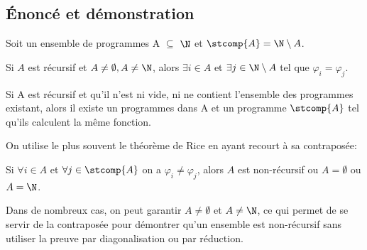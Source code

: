 \subsection{Énoncé et démonstration}

Soit un ensemble de programmes A $\subseteq$ $\N$ et $\stcomp{A} = \N \setminus A$.

\begin{mytheo}[Rice]
	Si $A$ est récursif et $A\neq \emptyset, A \neq \N$,
  alors $\exists i \in A$ et $\exists j \in \N \setminus A$ tel que $\varphi _i = \varphi _j$.
	
	Si A est récursif et qu'il n'est ni vide, ni ne contient l'ensemble des programmes existant, 
  alors il existe un programmes dans A et un programme $\stcomp{A}$ tel qu'ils calculent la même fonction. 
\end{mytheo}

On utilise le plus souvent le théorème de Rice en ayant recourt à sa contraposée:

\begin{mytheo}
	Si $\forall  i \in A$ et $\forall j \in \stcomp{A}$ on a $\varphi_i \neq \varphi_j$, alors $A$ est non-récursif ou $A = \emptyset$ ou $A = \N$.
\end{mytheo}

Dans de nombreux cas, on peut garantir $A \neq \emptyset$ et $A \neq \N$, ce qui permet de se servir de la contraposée pour démontrer qu'un ensemble est non-récursif sans utiliser la preuve par diagonalisation ou par réduction.


